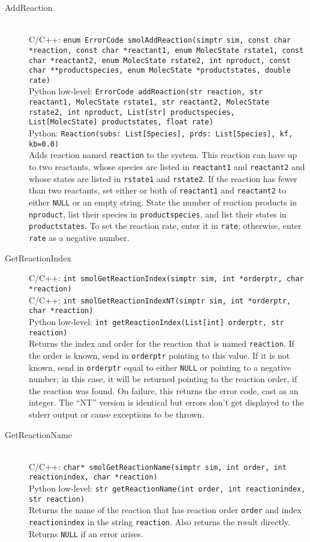 \documentclass {book}
\newcommand {\ttt} {\texttt}
\begin{document}
\begin{description}

\item[AddReaction]
\hfill \\
C/C++: \ttt{enum ErrorCode smolAddReaction(simptr sim, const char *reaction, const char *reactant1, enum MolecState rstate1, const char *reactant2, enum MolecState rstate2, int nproduct, const char **productspecies, enum MolecState *productstates, double rate)}\\
Python low-level: \ttt{ErrorCode addReaction(str reaction, str reactant1, MolecState rstate1, str reactant2, MolecState rstate2, int nproduct, List[str] productspecies, List[MolecState] productstates, float rate)}\\
Python: \ttt{Reaction(subs: List[Species], prds: List[Species], kf, kb=0.0)}\\
Adds reaction named \ttt{reaction} to the system. This reaction can have up to two reactants, whose species are listed in \ttt{reactant1} and \ttt{reactant2} and whose states are listed in \ttt{rstate1} and \ttt{rstate2}. If the reaction has fewer than two reactants, set either or both of \ttt{reactant1} and \ttt{reactant2} to either \ttt{NULL} or an empty string. State the number of reaction products in \ttt{nproduct}, list their species in \ttt{productspecies}, and list their states in \ttt{productstates}. To set the reaction rate, enter it in \ttt{rate}; otherwise, enter \ttt{rate} as a negative number.

\item[GetReactionIndex]
C/C++: \ttt{int smolGetReactionIndex(simptr sim, int *orderptr, char *reaction)}\\
C/C++: \ttt{int smolGetReactionIndexNT(simptr sim, int *orderptr, char *reaction)}\\
Python low-level: \ttt{int getReactionIndex(List[int] orderptr, str reaction)}\\
Returns the index and order for the reaction that is named \ttt{reaction}. If the order is known, send in \ttt{orderptr} pointing to this value. If it is not known, send in \ttt{orderptr} equal to either \ttt{NULL} or pointing to a negative number; in this case, it will be returned pointing to the reaction order, if the reaction was found. On failure, this returns the error code, cast as an integer. The ``NT'' version is identical but errors don't get displayed to the stderr output or cause exceptions to be thrown.

\item[GetReactionName]
\hfill \\
C/C++: \ttt{char* smolGetReactionName(simptr sim, int order, int reactionindex, char *reaction)}\\
Python low-level: \ttt{str getReactionName(int order, int reactionindex, str reaction)}\\
Returns the name of the reaction that has reaction order \ttt{order} and index \ttt{reactionindex} in the string \ttt{reaction}. Also returns the result directly. Returns \ttt{NULL} if an error arises.


\end{description}
\end{document}
